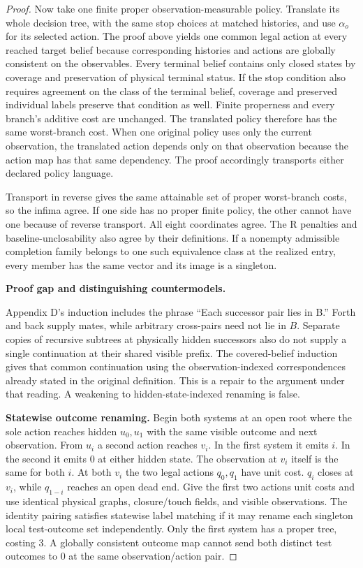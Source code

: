 \begin{proof}
Now take one finite proper observation-measurable policy. Translate its whole decision tree, with the same stop choices at matched histories, and use \(\alpha_o\) for its selected action. The proof above yields one common legal action at every reached target belief because corresponding histories and actions are globally consistent on the observables. Every terminal belief contains only closed states by coverage and preservation of physical terminal status. If the stop condition also requires agreement on the class of the terminal belief, coverage and preserved individual labels preserve that condition as well. Finite properness and every branch's additive cost are unchanged. The translated policy therefore has the same worst-branch cost. When one original policy uses only the current observation, the translated action depends only on that observation because the action map has that same dependency. The proof accordingly transports either declared policy language.

Transport in reverse gives the same attainable set of proper worst-branch costs, so the infima agree. If one side has no proper finite policy, the other cannot have one because of reverse transport. All eight coordinates agree. The R penalties and baseline-unclosability also agree by their definitions. If a nonempty admissible completion family belongs to one such equivalence class at the realized entry, every member has the same vector and its image is a singleton.

\textbf{Proof gap and distinguishing countermodels.}

Appendix D's induction includes the phrase ``Each successor pair lies in B.'' Forth and back supply mates, while arbitrary cross-pairs need not lie in \(B\). Separate copies of recursive subtrees at physically hidden successors also do not supply a single continuation at their shared visible prefix. The covered-belief induction gives that common continuation using the observation-indexed correspondences already stated in the original definition. This is a repair to the argument under that reading. A weakening to hidden-state-indexed renaming is false.

\textbf{Statewise outcome renaming.} Begin both systems at an open root where the sole action reaches hidden \(u_0,u_1\) with the same visible outcome and next observation. From \(u_i\) a second action reaches \(v_i\). In the first system it emits \(i\). In the second it emits \(0\) at either hidden state. The observation at \(v_i\) itself is the same for both \(i\). At both \(v_i\) the two legal actions \(q_0,q_1\) have unit cost. \(q_i\) closes at \(v_i\), while \(q_{1-i}\) reaches an open dead end. Give the first two actions unit costs and use identical physical graphs, closure/touch fields, and visible observations. The identity pairing satisfies statewise label matching if it may rename each singleton local test-outcome set independently. Only the first system has a proper tree, costing \(3\). A globally consistent outcome map cannot send both distinct test outcomes to \(0\) at the same observation/action pair.


\end{proof}
